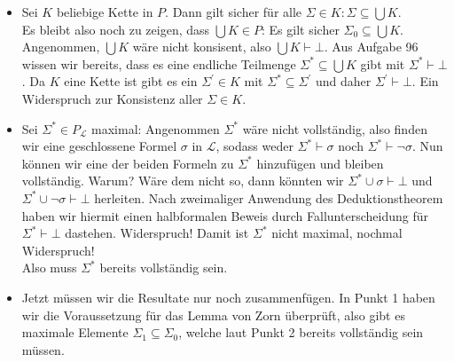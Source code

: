\begin{solution}
\phantom{}
\begin{itemize}
  \item Sei $K$ beliebige Kette in $P$. Dann gilt sicher für alle
  $\Sigma \in K: \Sigma \subseteq \bigcup K$. \\
  Es bleibt also noch zu zeigen, dass $\bigcup K \in P$:
  Es gilt sicher $\Sigma_0 \subseteq \bigcup K$. \\
  Angenommen, $\bigcup K$
  wäre nicht konsisent, also $\bigcup K \vdash \bot$. Aus Aufgabe 96 wissen wir bereits, dass es eine endliche Teilmenge $\Sigma^\ast \subseteq \bigcup K$ gibt mit $\Sigma^\ast \vdash \bot$. Da $K$ eine Kette ist gibt es ein $\Sigma^\prime \in K$ mit $\Sigma^\ast \subseteq \Sigma^\prime$ und daher $\Sigma^\prime \vdash \bot$. Ein Widerspruch zur Konsistenz aller $\Sigma \in K$. 
  \item Sei $\Sigma^* \in P_{\mathscr{L}}$ maximal: Angenommen $\Sigma^*$ wäre nicht vollständig,
  also finden wir eine geschlossene Formel $\sigma$ in $\mathscr{L}$, sodass weder
  $\Sigma^* \vdash \sigma$ noch $\Sigma^* \vdash \neg \sigma$. Nun können wir eine
  der beiden Formeln zu $\Sigma^*$ hinzufügen und bleiben vollständig. Warum?
  Wäre dem nicht so, dann könnten wir $\Sigma^* \cup \sigma \vdash \bot$
  und $\Sigma^* \cup \neg \sigma \vdash \bot$ herleiten. Nach zweimaliger
  Anwendung des Deduktionstheorem haben wir hiermit einen halbformalen Beweis
  durch Fallunterscheidung für $\Sigma^* \vdash \bot$ dastehen. Widerspruch!
  Damit ist $\Sigma^*$ nicht maximal, nochmal Widerspruch! \\
  Also muss $\Sigma^*$ bereits vollständig sein.
  \item Jetzt müssen wir die Resultate nur noch zusammenfügen. In Punkt 1
  haben wir die Voraussetzung für das Lemma von Zorn überprüft, also
  gibt es maximale Elemente $\Sigma_1 \subseteq \Sigma_0$, welche laut Punkt 2
  bereits vollständig sein müssen.

\end{itemize}

\end{solution}

